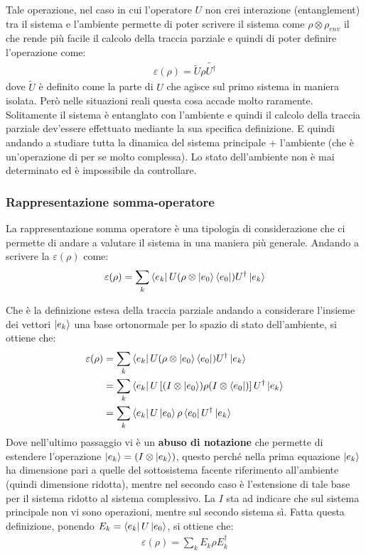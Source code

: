 Tale operazione, nel caso in cui l'operatore \(U\) non crei interazione (entanglement) tra il sistema e l'ambiente permette di poter scrivere il sistema come \(\rho \otimes \rho_{env}\) il che rende più facile il calcolo della traccia parziale e quindi di poter definire l'operazione come:
\begin{gather*}
    \varepsilon(\rho) = \tilde{U} \rho \tilde{U^\dagger}
\end{gather*}
dove \(\tilde{U}\) è definito come la parte di \(U\) che agisce sul primo sistema in maniera isolata.
Però nelle situazioni reali questa cosa accade molto raramente. Solitamente il sistema è entanglato con l'ambiente e quindi il calcolo della traccia parziale dev'essere effettuato mediante la sua specifica definizione. E quindi andando a studiare tutta la dinamica del sistema principale + l'ambiente (che è un'operazione di per se molto complessa). Lo stato dell'ambiente non è mai determinato ed è impossibile da controllare.

\subsubsection{Rappresentazione somma-operatore}
La rappresentazione somma operatore è una tipologia di considerazione che ci permette di andare a valutare il sistema in una maniera più generale. Andando a scrivere la \(\varepsilon(\rho)\) come:
\begin{gather*}
    \varepsilon(\rho) = \sum_k \bra{e_k} U (\rho \otimes \ket{e_0}\bra{e_0}) U^\dagger \ket{e_k}
\end{gather*}

Che è la definizione estesa della traccia parziale andando a considerare l'insieme dei vettori \(\ket{e_k}\) una base ortonormale per lo spazio di stato dell'ambiente, si ottiene che:
\begin{align*}
    \varepsilon(\rho) &= \sum_k \bra{e_k} U (\rho \otimes \ket{e_0}\bra{e_0}) U^\dagger \ket{e_k}\\
    &=\sum_k \bra{e_k} U \left[(I \otimes \ket{e_0}) \rho (I \otimes \bra{e_0})\right] U^\dagger \ket{e_k}\\
    &= \sum_k \bra{e_k}U\ket{e_0} \rho \bra{e_0} U^\dagger \ket{e_k}
\end{align*}
Dove nell'ultimo passaggio vi è un \textbf{abuso di notazione} che permette di estendere l'operazione \(\ket{e_k} = (I \otimes \ket{e_k})\), questo perché nella prima equazione \(\ket{e_k}\) ha dimensione pari a quelle del sottosistema facente riferimento all'ambiente (quindi dimensione ridotta), mentre nel secondo caso è l'estensione di tale base per il sistema ridotto al sistema complessivo. La \(I\) sta ad indicare che sul sistema principale non vi sono operazioni, mentre sul secondo sistema sì. 
Fatta questa definizione, ponendo \(E_k = \bra{e_k} U \ket{e_0}\), si ottiene che:
\begin{gather*}
    \varepsilon(\rho) = \sum_k E_k \rho E_k^\dagger
\end{gather*}

